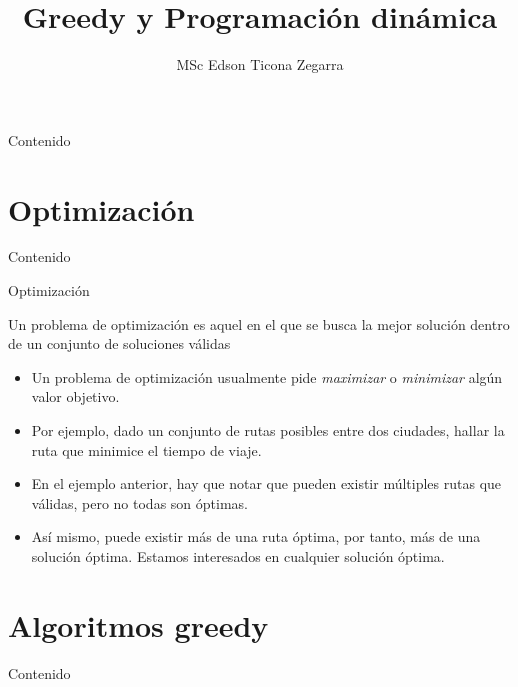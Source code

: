 \documentclass[]{beamer}
\title{Greedy y Programaci\'on din\'amica}
\author{MSc Edson Ticona Zegarra}
\institute{Campamento de Programaci\'on}
\date{}
\begin{document}
\maketitle

\begin{frame}{Contenido}
\tableofcontents
\end{frame}

\section{Optimizaci\'on}
\begin{frame}{Contenido}
\tableofcontents[currentsection]
\end{frame}

\begin{frame}{Optimizaci\'on}
  \begin{definition}
    Un problema de optimizaci\'on es aquel en el que se busca la mejor soluci\'on dentro de un conjunto de soluciones v\'alidas
  \end{definition}
  \begin{itemize}
    \item Un problema de optimizaci\'on usualmente pide \textit{maximizar} o \textit{minimizar} alg\'un valor objetivo.
    \pause
    \item Por ejemplo, dado un conjunto de rutas posibles entre dos ciudades, hallar la ruta que minimice el tiempo de viaje.
    \pause
    \item En el ejemplo anterior, hay que notar que pueden existir m\'ultiples rutas que v\'alidas, pero no todas son \'optimas.
    \pause
    \item As\'i mismo, puede existir m\'as de una ruta \'optima, por tanto, m\'as de una soluci\'on \'optima. Estamos interesados en cualquier soluci\'on \'optima.
  \end{itemize}
\end{frame}

\section{Algoritmos greedy}
\begin{frame}{Contenido}
\tableofcontents[currentsection]
\end{frame}
\end{document}
